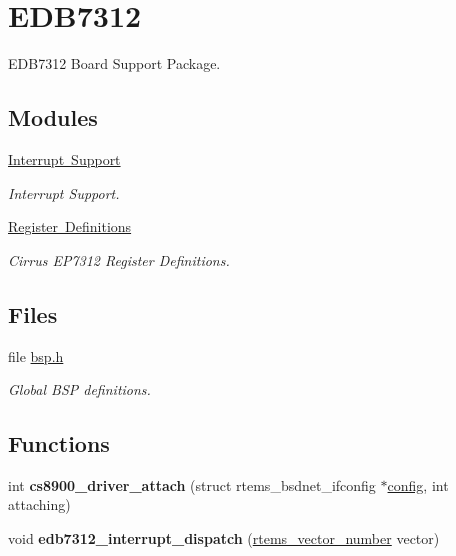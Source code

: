\hypertarget{group__RTEMSBSPsARMEDB7312}{}\section{E\+D\+B7312}
\label{group__RTEMSBSPsARMEDB7312}


E\+D\+B7312 Board Support Package.  


\subsection*{Modules}
\begin{DoxyCompactItemize}
\item 
\mbox{\hyperlink{group__edb7312__interrupt}{Interrupt Support}}
\begin{DoxyCompactList}\small\item\em Interrupt Support. \end{DoxyCompactList}\item 
\mbox{\hyperlink{group__edb7312__registers}{Register Definitions}}
\begin{DoxyCompactList}\small\item\em Cirrus E\+P7312 Register Definitions. \end{DoxyCompactList}\end{DoxyCompactItemize}
\subsection*{Files}
\begin{DoxyCompactItemize}
\item 
file \mbox{\hyperlink{bsps_2arm_2edb7312_2include_2bsp_8h}{bsp.\+h}}
\begin{DoxyCompactList}\small\item\em Global B\+SP definitions. \end{DoxyCompactList}\end{DoxyCompactItemize}
\subsection*{Functions}
\begin{DoxyCompactItemize}
\item 
\mbox{\label{group__RTEMSBSPsARMEDB7312_ga6bc0d2aa6cdac399f8e347a93b8ca804}} 
int {\bfseries cs8900\+\_\+driver\+\_\+attach} (struct rtems\+\_\+bsdnet\+\_\+ifconfig $\ast$\mbox{\hyperlink{structconfig__s}{config}}, int attaching)
\item 
\mbox{\label{group__RTEMSBSPsARMEDB7312_ga0db4d212560752067541c495bbd84d7e}} 
void {\bfseries edb7312\+\_\+interrupt\+\_\+dispatch} (\mbox{\hyperlink{group__ClassicINTR_ga3e434c197d99f128e78cae4d9358bd8b}{rtems\+\_\+vector\+\_\+number}} vector)
\end{DoxyCompactItemize}
